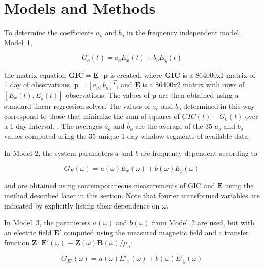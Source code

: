 \documentclass[draft,linenumbers]{agujournal2018}
\begin{document}
\section{Models and Methods}

To determine the coefficients $a_o$ and $b_o$ in the frequency independent model, Model~1,

\begin{linenomath*}
\begin{equation}
G_o(t) = a_oE_x(t) + b_oE_y(t)
\label{model1}
\end{equation}
\end{linenomath*}

\noindent
the matrix equation $\mathbf{GIC} = \underline{\mathbf{E}}\cdot\mathbf{p}$ is created, where $\mathbf{GIC}$ is a 864000x1 matrix of 1 day of observations, $\mathbf{p} = [a_o,b_o]^T$, and $\underline{\mathbf{E}}$ is a 86400x2 matrix with rows of $[E_x(t), E_y(t)]$ observations. The values of $\mathbf{p}$ are then obtained using a standard linear regression solver. The values of $a_o$ and $b_o$ determined in this way correspond to those that minimize the sum-of-squares of $GIC(t)-G_o(t)$ over a 1-day interval. \citep[][provided the mathematically equivalent closed-form equations.]{Pulkkinen2007}. The averages $\overline{a}_o$ and $\overline{b}_o$ are the average of the 35 $a_o$ and $b_o$ values computed using the 35 unique 1-day window segments of available data.

In Model 2, the system parameters $a$ and $b$ are frequency dependent according to

\begin{linenomath*}
\begin{equation}
G_E(\omega) = a(\omega)E_x(\omega) + b(\omega)E_y(\omega)
\label{model2}
\end{equation}
\end{linenomath*}
\noindent
and are obtained using contemporaneous measurements of GIC and $\mathbf{E}$ using the method described later in this section. Note that fourier transformed variables are indicated by explicitly listing their dependence on $\omega$.

In Model~3, the parameters $a(\omega)$ and $b(\omega)$ from Model~2 are used, but with an electric field $\mathbf{E}'$ computed using the measured magnetic field and a transfer function $\boldsymbol{Z}$: $\mathbf{E}'(\omega) \equiv \boldsymbol{Z}(\omega)\mathbf{B}(\omega)/\mu_o$:

\setcounter{equation}{2}
\begin{linenomath*}
\begin{equation}
G_{E'}(\omega) = a(\omega)E'_x(\omega) + b(\omega)E'_y(\omega)
\label{model3}
\end{equation}
\end{linenomath*}
\end{document}
